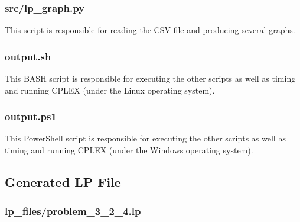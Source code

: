 \documentclass[12pt]{article} %
\begin{document}
\subsubsection{src/lp\_graph.py}
This script is responsible for reading the CSV file and producing several graphs.


\subsubsection{output.sh}
This BASH script is responsible for executing the other scripts as well as timing and running CPLEX (under the Linux operating system).


\subsubsection{output.ps1}
This PowerShell script is responsible for executing the other scripts as well as timing and running CPLEX (under the Windows operating system).


\newpage

\subsection{Generated LP File}

\subsubsection{lp\_files/problem\_3\_2\_4.lp}

\end{document}
